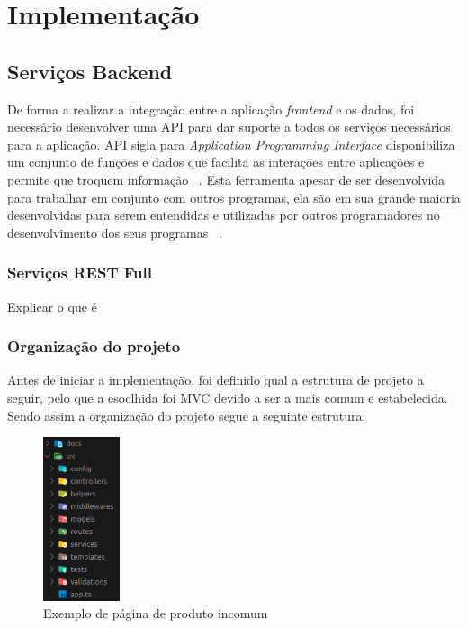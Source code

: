 \chapter{Implementação}



\newpage

\section{Serviços Backend}

De forma a realizar a integração entre a aplicação \emph{frontend} e os dados, foi necessário desenvolver
uma API para dar suporte a todos os serviços necessários para a aplicação.
API sigla para \emph{Application Programming Interface} disponibiliza um conjunto de funções e
dados que facilita as interações entre aplicações e permite que troquem informação ~\cite{rest_cookbook}.
Esta ferramenta apesar de ser desenvolvida para trabalhar em conjunto com outros programas, ela são
em sua grande maioria desenvolvidas para serem entendidas e utilizadas por outros programadores no
desenvolvimento dos seus programas ~\cite{api_design}.

\subsection{Serviços REST Full}
Explicar o que é

\subsection{Organização do projeto}
Antes de iniciar a implementação, foi definido qual a estrutura de projeto a seguir, pelo que a esoclhida
foi MVC devido a ser a mais comum e estabelecida. Sendo assim a organização do projeto segue a seguinte estrutura:
\begin{figure}[htb]
  \centering
  \includegraphics[width=0.2\textwidth]{images/implementacao/api/project_organization.png}
  \caption{Exemplo de página de produto incomum}
  \label{fig:61}
\end{figure}

